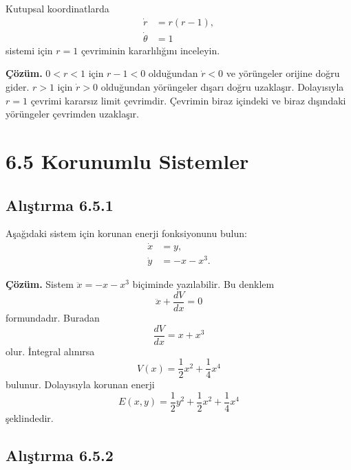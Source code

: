 \begin{justify}
Kutupsal koordinatlarda
\begin{align}
\dot{r} &= r(r-1),\\
\dot{\theta} &= 1
\end{align}
sistemi için $r=1$ çevriminin kararlılığını inceleyin.

\textbf{Çözüm.} $0<r<1$ için $r-1<0$ olduğundan $\dot{r}<0$ ve yörüngeler orijine doğru gider. $r>1$ için $\dot{r}>0$ olduğundan yörüngeler dışarı doğru uzaklaşır. Dolayısıyla $r=1$ çevrimi kararsız limit çevrimdir. Çevrimin biraz içindeki ve biraz dışındaki yörüngeler çevrimden uzaklaşır.
\end{justify}

\section*{6.5 Korunumlu Sistemler}

\subsection*{Alıştırma 6.5.1}

\begin{justify}
Aşağıdaki sistem için korunan enerji fonksiyonunu bulun:
\begin{align}
\dot{x} &= y,\\
\dot{y} &= -x-x^3.
\end{align}

\textbf{Çözüm.} Sistem $\ddot{x}=-x-x^3$ biçiminde yazılabilir. Bu denklem
\begin{equation}
\ddot{x}+\frac{dV}{dx}=0
\end{equation}
formundadır. Buradan
\begin{equation}
\frac{dV}{dx}=x+x^3
\end{equation}
olur. İntegral alınırsa
\begin{equation}
V(x)=\frac{1}{2}x^2+\frac{1}{4}x^4
\end{equation}
bulunur. Dolayısıyla korunan enerji
\begin{equation}
E(x,y)=\frac{1}{2}y^2+\frac{1}{2}x^2+\frac{1}{4}x^4
\end{equation}
şeklindedir.
\end{justify}

\subsection*{Alıştırma 6.5.2}

